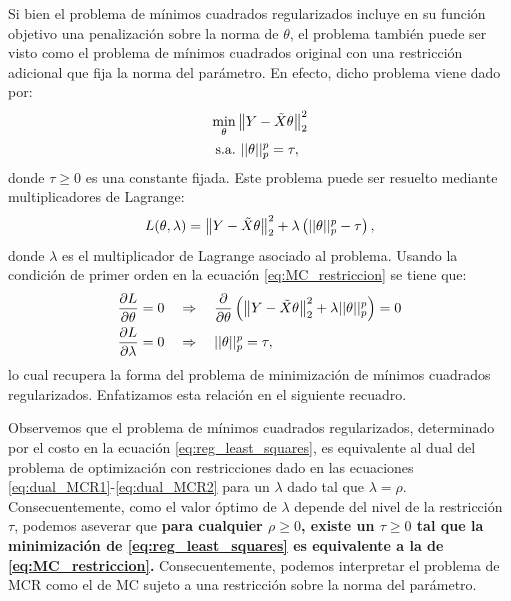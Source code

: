 Si bien el problema de mínimos cuadrados regularizados incluye en su función objetivo una penalización sobre la norma de $\theta$, el problema también puede ser visto como el problema de mínimos cuadrados original con una restricción adicional que fija la norma del parámetro. En efecto, dicho problema viene dado por:
\begin{align}
	\min_\theta & \left\lVert Y-\tilde{X}\theta\right\rVert_2^2\label{eq:dual_MCR1}\\
	\text{s.a.} &\ ||\theta||_p^p = \tau,\label{eq:dual_MCR2}
\end{align}
donde $\tau\geq0$ es una constante fijada. Este problema puede ser resuelto mediante multiplicadores de Lagrange:
\begin{equation}
	L(\theta,\lambda) = \left\lVert Y-\tilde{X}\theta\right\rVert_2^2 + \lambda \left(||\theta||_p^p - \tau\right),
	\label{eq:MC_restriccion}
\end{equation}
donde $\lambda$ es el multiplicador de Lagrange asociado al problema. Usando la condición de primer orden en la ecuación \eqref{eq:MC_restriccion} se tiene que: 
\begin{align}
	\frac{\partial L}{\partial \theta} = 0 &\quad\Rightarrow\quad  \frac{\partial }{\partial \theta}\left(\left\lVert Y-\tilde{X}\theta\right\rVert_2^2 + \lambda ||\theta||_p^p \right) = 0\\
	\frac{\partial L}{\partial \lambda} = 0 &\quad\Rightarrow\quad ||\theta||_p^p = \tau,
\end{align}
lo cual recupera la forma del problema de minimización de mínimos cuadrados regularizados. Enfatizamos esta relación en el siguiente recuadro. 

\begin{mdframed}[style=discusion, frametitle={\center Mínimos cuadrados regularizados: optimización con restricciones}]
Observemos que el problema de mínimos cuadrados regularizados, determinado por el costo en la ecuación \eqref{eq:reg_least_squares}, es equivalente al dual del problema de optimización con restricciones dado en las ecuaciones \eqref{eq:dual_MCR1}-\eqref{eq:dual_MCR2} para un $\lambda$ dado tal que $\lambda =\rho$. Consecuentemente, como el valor óptimo de $\lambda$ depende del nivel de la restricción $\tau$, podemos aseverar que \textbf{para cualquier $\rho\geq0$, existe un $\tau\geq0$ tal que la minimización de \eqref{eq:reg_least_squares} es equivalente a la de \eqref{eq:MC_restriccion}.} Consecuentemente,  podemos interpretar el problema de MCR como el de MC sujeto a una restricción sobre la norma del parámetro. 
	
\end{mdframed}

